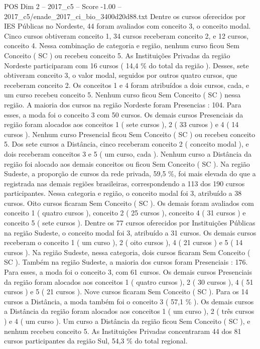 \begin{textsample}{POS Dim 2 – 2017\_c5 – Score -1.00 – 2017\_c5/enade\_2017\_ci\_bio\_3400d20d88.txt}
Dentre os cursos oferecidos por IES Públicas no Nordeste, 44 foram avaliados com conceito 3, o conceito modal.
Cinco cursos obtiveram conceito 1, 34 cursos receberam conceito 2, e 12 cursos, conceito 4.
Nessa combinação de categoria e região, nenhum curso ficou Sem Conceito ( SC ) ou recebeu conceito 5.
As Instituições Privadas da região Nordeste participaram com 16 cursos ( 14,4 \% do total da região ).
Desses, sete obtiveram conceito 3, o valor modal, seguidos por outros quatro cursos, que receberam conceito 2.
Os conceitos 1 e 4 foram atribuídos a dois cursos, cada, e um curso recebeu conceito 5.
Nenhum curso ficou Sem Conceito ( SC ) nessa região.
A maioria dos cursos na região Nordeste foram Presencias : 104.
Para esses, a moda foi o conceito 3 com 50 cursos.
Os demais cursos Presenciais da região foram alocados aos conceitos 1 ( sete cursos ), 2 ( 33 cursos ) e 4 ( 14 cursos ).
Nenhum curso Presencial ficou Sem Conceito ( SC ) ou recebeu conceito 5.
Dos sete cursos a Distância, cinco receberam conceito 2 ( conceito modal ), e dois receberam conceitos 3 e 5 ( um curso, cada ).
Nenhum curso a Distância da região foi alocado aos demais conceitos ou ficou Sem Conceito ( SC ).
Na região Sudeste, a proporção de cursos da rede privada, 59,5 \%, foi mais elevada do que a registrada nas demais regiões brasileiras, correspondendo a 113 dos 190 cursos participantes.
Nessa categoria e região, o conceito modal foi 3, atribuído a 38 cursos.
Oito cursos ficaram Sem Conceito ( SC ).
Os demais foram avaliados com conceito 1 ( quatro cursos ), conceito 2 ( 25 cursos ), conceito 4 ( 31 cursos ) e conceito 5 ( sete cursos ).
Dentre os 77 cursos oferecidos por Instituições Públicas na região Sudeste, o conceito modal foi 3, atribuído a 31 cursos.
Os demais cursos receberam o conceito 1 ( um curso ), 2 ( oito cursos ), 4 ( 21 cursos ) e 5 ( 14 cursos ).
Na região Sudeste, nessa categoria, dois cursos ficaram Sem Conceito ( SC ).
Também na região Sudeste, a maioria dos cursos foram Presenciais : 176.
Para esses, a moda foi o conceito 3, com 61 cursos.
Os demais cursos Presenciais da região foram alocados aos conceitos 1 ( quatro cursos ), 2 ( 30 cursos ), 4 ( 51 cursos ) e 5 ( 21 cursos ).
Nove cursos ficaram Sem Conceito ( SC ).
Para os 14 cursos a Distância, a moda também foi o conceito 3 ( 57,1 \% ).
Os demais cursos a Distância da região foram alocados aos conceitos 1 ( um curso ), 2 ( três cursos ) e 4 ( um curso ).
Um curso a Distância da região ficou Sem Conceito ( SC ), e nenhum recebeu conceito 5.
As Instituições Privadas concentraram 44 dos 81 cursos participantes da região Sul, 54,3 \% do total regional.

\end{textsample}
